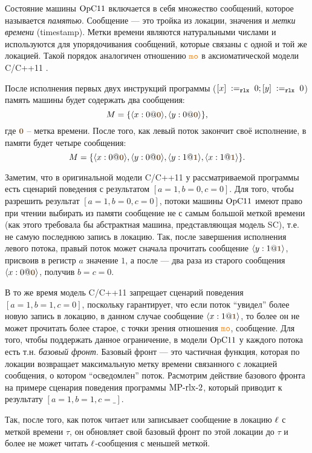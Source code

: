 Состояние машины $\mathrm{OpC11}$ включается в себя множество сообщений, которое называется 
\emph{памятью}. Сообщение --- это тройка из локации, значения и \emph{метки времени} (timestamp).
Метки времени являются натуральными числами и используются для упорядочивания сообщений, которые связаны с одной и той же локацией.
Такой порядок аналогичен отношению $\lMO$ в аксиоматической модели C/C++11 \cite{Batty-al:POPL11}.

После исполнения первых двух инструкций программы
($[x] \;:=_{\mathtt{rlx}}\;0; [y] \;:=_{\mathtt{rlx}}\;0$) память машины будет содержать два сообщения:
\[
M = \{\angled{x:0@\tstamp{0}}, \angled{y:0@\tstamp{0}}\},
\]
где $\tstamp{0}$ -- метка времени.
После того, как левый поток закончит своё исполнение, в памяти будет четыре сообщения:
\[
M = \{\angled{x:0@\tstamp{0}}, \angled{y:0@\tstamp{0}},
      \angled{y:1@\tstamp{1}},\angled{x:1@\tstamp{1}}\}.
\]

Заметим, что в оригинальной модели C/C++11 \cite{Batty-al:POPL11} у рассматриваемой программы есть сценарий поведения
с результатом $[a = 1, b = 0, c = 0]$.
Для того, чтобы разрешить результат $[a = 1, b = 0, c = 0]$, потоки машины $\mathrm{OpC11}$ имеют право при чтении выбирать из памяти
сообщение не с самым большой меткой времени (как этого требовала бы абстрактная машина, представляющая модель SC), т.е.
не самую последнюю запись в локацию.
Так, после завершения исполнения левого потока, правый поток может сначала прочитать сообщение $\angled{y:1@\tstamp{1}}$,
присвоив в регистр $a$ значение $1$, а после --- два раза из старого сообщения $\angled{x:0@\tstamp{0}}$,
получив $b = c = 0$.

В то же время модель C/C++11 запрещает сценарий поведения $[a = 1, b = 1, c = 0]$, поскольку гарантирует, что если поток
``увидел'' более новую запись в локацию, в данном случае сообщение $\angled{x:1@\tstamp{1}}$,
то более он не может прочитать более старое, с точки зрения отношения $\lMO$, сообщение.
Для того, чтобы поддержать данное ограничение, в модели $\mathrm{OpC11}$ у каждого потока есть т.н. \emph{базовый фронт}.
Базовый фронт --- это частичная функция, которая по локации возвращает максимальную метку времени связанного с локацией сообщения, о
котором ``осведомлен'' поток.
Расмотрим действие базового фронта на примере сценария поведения программы ${\rm MP\text{-}rlx\text{-}2}$,
который приводит к результату $[a = 1, b = 1, c = \_]$.


Так, после того, как поток читает или записывает сообщение в локацию $\ell$ с меткой времени $\tau$, он обновляет
свой базовый фронт по этой локации до $\tau$ и более не может читать $\ell$-сообщения с меньшей меткой.

